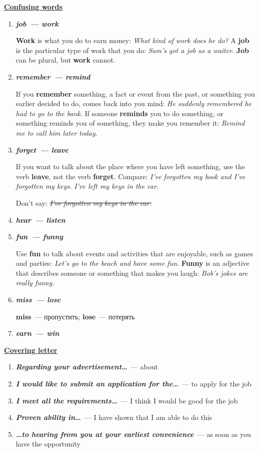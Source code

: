 \documentclass[10pt,a4paper]{article}
\newcommand\ex[1]{\textit{\textbf{{#1}}}}
\begin{document}
\textbf{\underline{Confusing words}}
\begin{enumerate}
  \item \ex{job~--- work}
  
  \textbf{Work} is what you do to earn money: \textit{What kind of work does he do?} A \textbf{job} is the particular type of work that you do: \textit{Sam's got a job as a waiter}. \textbf{Job} can be plural, but \textbf{work} cannot.
  \item \ex{remember~--- remind}
  
  If you \textbf{remember} something, a fact or event from the past, or something you earlier decided to do, comes back into you mind: \textit{He suddenly remembered he had to go to the bank}. If someone \textbf{reminds} you to do something, or something reminds you of something, they make you remember it: \textit{Remind me to call him later today}.
  \item \ex{forget~--- leave}
  
  If you want to talk about the place where you have left something, use the verb \textbf{leave}, not the verb \textbf{forget}. Compare: \textit{I've forgotten my book and I've forgotten my keys.} \textit{I've left my keys in the car}. 
  
  Don't say: \textit{\sout{I've forgotten my keys in the car.}}
  \item \ex{hear~--- listen}
  \item \ex{fun~--- funny}
  
  Use \textbf{fun} to talk about events and activities that are enjoyable, such as games and parties: \textit{Let's go to the beach and have some fun.} \textbf{Funny} is an adjective that describes someone or something that makes you laugh: \textit{Bob's jokes are really funny.}
  \item \ex{miss~--- lose}
  
  \textbf{miss}~--- пропустить; \textbf{lose}~--- потерять
  \item \ex{earn~--- win}  
\end{enumerate}

\textbf{\underline{Covering letter}}
\begin{enumerate}
  \item \ex{Regarding your advertisement\dots}~--- about
  \item \ex{I would like to submit an application for the\dots}~--- to apply for the job
  \item \ex{I meet all the requirements\dots}~--- I think I would be good for the job
  \item \ex{Proven ability in\dots}~--- I have shown that I am able to do this
  \item \ex{\dots to hearing from you at your earliest convenience}~--- as soon as you have the opportunity
\end{enumerate}
\end{document}
